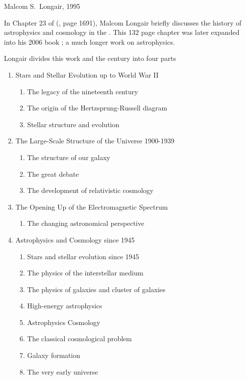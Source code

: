 
Malcom S.\ Longair, 1995

In Chapter 23 of  (\cite{Physics1995},
page 1691), Malcom Longair \cite{Longair1995} briefly discusses the
history of astrophysics and cosmology in the .  This 132 page
chapter was later expanded into his 2006 book ;
a much longer work on  astrophysics.

Longair divides this work and the century into four parts

\begin{enumerate}
\item Stars and Stellar Evolution up to World War II
  \begin{enumerate}
  \item The legacy of the nineteenth century
  \item The origin of the Hertzsprung-Russell diagram
  \item Stellar structure and evolution
  \end{enumerate}

\item The Large-Scale Structure of the Universe 1900-1939
  \begin{enumerate}
  \item The structure of our galaxy
  \item The great debate
  \item The development of relativistic cosmology
  \end{enumerate}

\item The Opening Up of the Electromagnetic Spectrum
  \begin{enumerate}
  \item The changing astronomical perspective
  \end{enumerate}

\item Astrophysics and Cosmology since 1945
  \begin{enumerate}
  \item Stars and stellar evolution since 1945
  \item The physics of the interstellar medium
  \item The physics of galaxies and cluster of galaxies
  \item High-energy astrophysics
  \item Astrophysics Cosmology
  \item The classical cosmological problem
  \item Galaxy formation
  \item The very early universe
  \end{enumerate}
\end{enumerate}

